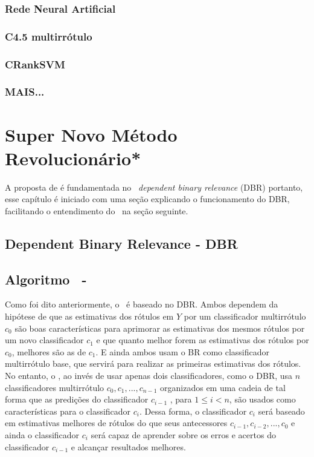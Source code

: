 \subsection{Rede Neural Artificial}
\subsection{C4.5 multirrótulo}
\subsection{CRankSVM}
\subsection{MAIS...}


\chapter{Super Novo Método Revolucionário*}
A proposta de \MRLM é fundamentada no \MML~\textit{dependent binary relevance} (DBR) \cite{dbr2014} portanto,
esse capítulo é iniciado com uma seção explicando o funcionamento do DBR, facilitando o entendimento do \MRLMa~na seção seguinte.

\section{Dependent Binary Relevance - DBR}
\section{Algoritmo \MRLM~-~\MRLMa}
Como foi dito anteriormente, o \MRLM~é baseado no DBR. 
Ambos dependem da hipótese de que as estimativas dos rótulos em $Y$ por um classificador multirrótulo $c_0$
são boas características para aprimorar as estimativas dos mesmos rótulos por um novo classificador $c_1$
e que quanto melhor forem as estimativas dos rótulos por $c_0$, melhores são as de $c_1$.
E ainda ambos usam o BR como classificador multirrótulo base, que servirá para realizar as primeiras estimativas dos 
rótulos.
 No entanto, o \MRLMa, ao invés de usar apenas dois classificadores, como o DBR, 
 usa $n$ classificadores multirrótulo $c_0,c_1,...,c_{n-1}$ organizados em uma cadeia de tal forma que
 as predições do classificador $c_{i-1}$ , para $1\leq i<n$, são usados como características para o classificador $c_{i}$. 
 Dessa forma, o classificador $c_{i}$ será baseado em estimativas melhores de rótulos do que seus antecessores $c_{i-1},c_{i-2},...,c_0$ e ainda
 o classificador $c_{i}$ será capaz de aprender sobre os erros e acertos do classificador $c_{i-1}$ e alcançar resultados melhores.
 
